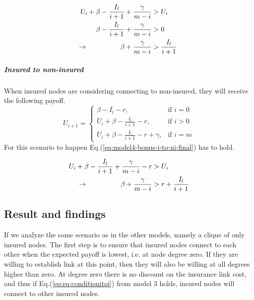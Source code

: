 \begin{eqnarray}
U_{i}+\beta-\frac{I_{l}}{i+1}+\frac{\gamma}{m-i}&>U_{i} \nonumber \\ 
\beta-\frac{I_{l}}{i+1}+\frac{\gamma}{m-i}&>0 \nonumber \\ 
\llap{$\rightarrow$\hspace{50pt}}\beta +\frac{\gamma}{m-i}&>\frac{I_{l}}{i+1}
\label{eq:model4-bonus-i-to-i}
\end{eqnarray}

\subparagraph{Insured to non-insured}
When insured nodes are considering connecting to non-insured, they will receive the following payoff.
\begin{equation}
U_{i+1}= 
\begin{cases}
    \beta - I_{l}-r,& \text{if } i = 0\\
    U_{i}+\beta -\frac{I_{l}}{i+1}-r,& \text{if }  i>0\\
    U_{i}+\beta -\frac{I_{l}}{i+1}-r+\gamma,& \text{if } i=m
\end{cases}
\label{eq:model4-bonus-i-to-ni}
\end{equation}
For this scenario to happen Eq.(\ref{eq:model4-bonus-i-to-ni-final}) has to hold.

\begin{eqnarray}
U_{i}+\beta-\frac{I_{l}}{i+1}+\frac{\gamma}{m-i}-r&>U_{i} \nonumber \\ 
\llap{$\rightarrow$\hspace{50pt}}\beta+\frac{\gamma}{m-i}&>r+\frac{I_{l}}{i+1}
\label{eq:model4-bonus-i-to-ni-final}
\end{eqnarray}

\subsection{Result and findings}
If we analyze the same scenario as in the other models, namely a clique of only insured nodes. The first step is to ensure that insured nodes connect to each other when the expected payoff is lowest, i.e. at node degree zero. If they are willing to establish link at this point, then they will also be willing at all degrees higher than zero.
At degree zero there is no discount on the insurance link cost, and thus if Eq.(\ref{eq:eq:conditionitoi}) from model 3 holds, insured nodes will connect to other insured nodes.

